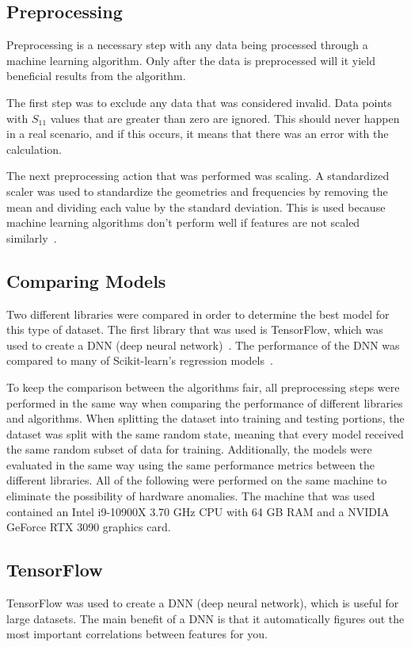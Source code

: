 \documentclass[lettersize,journal]{IEEEtran}
\begin{document}
\subsection{Preprocessing}
Preprocessing is a necessary step with any data being processed through a machine learning algorithm. Only after the data is preprocessed will it yield beneficial results from the algorithm.

The first step was to exclude any data that was considered invalid. Data points with $S_{11}$ values that are greater than zero are ignored. This should never happen in a real scenario, and if this occurs, it means that there was an error with the calculation. 

The next preprocessing action that was performed was scaling. A standardized scaler was used to standardize the geometries and frequencies by removing the mean and dividing each value by the standard deviation. This is used because machine learning algorithms don't perform well if features are not scaled similarly~\cite{9119820}. 


\subsection{Comparing Models}
Two different libraries were compared in order to determine the best model for this type of dataset. The first library that was used is TensorFlow, which was used to create a DNN (deep neural network)~\cite{tensorflow2015-whitepaper}. The performance of the DNN was compared to many of Scikit-learn's regression models~\cite{scikit-learn}.

To keep the comparison between the algorithms fair, all preprocessing steps were performed in the same way when comparing the performance of different libraries and algorithms. When splitting the dataset into training and testing portions, the dataset was split with the same random state, meaning that every model received the same random subset of data for training. Additionally, the models were evaluated in the same way using the same performance metrics between the different libraries. All of the following were performed on the same machine to eliminate the possibility of hardware anomalies. The machine that was used contained an Intel i9-10900X 3.70 GHz CPU with 64 GB RAM and a NVIDIA GeForce RTX 3090 graphics card. 


\subsection{TensorFlow}
TensorFlow was used to create a DNN (deep neural network), which is useful for large datasets. The main benefit of a DNN is that it automatically figures out the most important correlations between features for you. 
\end{document}
